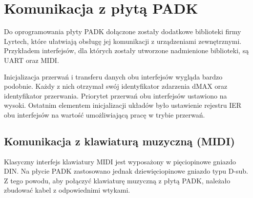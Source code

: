 \section{Komunikacja z płytą PADK}
Do oprogramowania płyty PADK dołączone zostały dodatkowe biblioteki firmy Lyrtech, które ułatwiają obsługę jej komunikacji z urządzeniami zewnętrznymi. Przykładem interfejsów, dla których zostały utworzone nadmienione biblioteki, są UART oraz MIDI.

Inicjalizacja przerwań i transferu danych obu interfejsów wygląda bardzo podobnie. Każdy z nich otrzymał swój identyfikator zdarzenia dMAX oraz identyfikator przerwania. Priorytet przerwań obu interfejsów ustawiono na wysoki. Ostatnim elementem inicjalizacji układów było ustawienie rejestru IER obu interfejsów na wartość umożliwiającą pracę w trybie przerwań.

\subsection{Komunikacja z klawiaturą muzyczną  (MIDI)}
Klasyczny interfejs klawiatury MIDI jest wyposażony w pięciopinowe gniazdo DIN. Na płycie PADK zastosowano jednak dziewięciopinowe gniazdo typu D-sub. Z tego powodu, aby połączyć klawiaturę muzyczną z płytą PADK, należało zbudować kabel z odpowiednimi wtykami.

